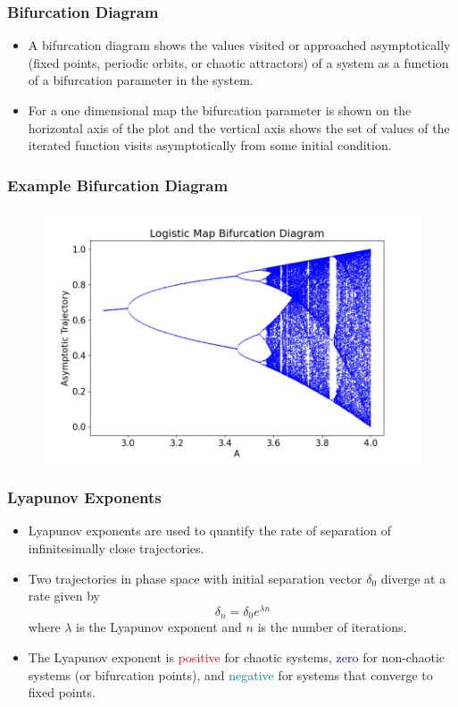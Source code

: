 \documentclass[
	11pt, %
	aspectratio=169, %
]{beamer}
\begin{document}

\begin{frame}
	\frametitle{Bifurcation Diagram}
    \begin{itemize}
        \item A bifurcation diagram shows the values visited or approached asymptotically (fixed points, periodic orbits, or chaotic attractors) of a system as a function of a bifurcation parameter in the system. \pause
        \item For a one dimensional map the bifurcation parameter is shown on the horizontal axis of the plot and the vertical axis shows the set of values of the iterated function visits asymptotically from some initial condition.
    \end{itemize}
\end{frame}


\begin{frame}
	\frametitle{Example Bifurcation Diagram}
    \begin{figure}
        \includegraphics[width=0.7\linewidth]{logistic_bifurcation_diagram.png}
    \end{figure}
\end{frame}


\begin{frame}
	\frametitle{Lyapunov Exponents}
    \begin{itemize}
        \item Lyapunov exponents are used to quantify the rate of separation of infinitesimally close trajectories. \pause
        \item Two trajectories in phase space with initial separation vector $\delta_0$ diverge at a rate given by 
        \begin{equation}
            \delta_n = \delta_0 e^{\lambda n}
        \end{equation}
        where $\lambda$ is the Lyapunov exponent and $n$ is the number of iterations. \pause
        \item The Lyapunov exponent is \textcolor{red}{positive} for chaotic systems, \textcolor{blue}{zero} for non-chaotic systems (or bifurcation points), and \textcolor{teal}{negative} for systems that converge to fixed points.
    \end{itemize}
\end{frame}
\end{document}
